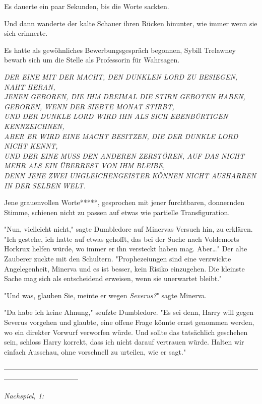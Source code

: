 {Es dauerte ein paar Sekunden, bis die Worte sackten.

Und dann wanderte der kalte Schauer ihren Rücken hinunter, wie immer wenn sie sich erinnerte.

Es hatte als gewöhnliches Bewerbungsgespräch begonnen, Sybill Trelawney bewarb sich um die Stelle als Professorin für Wahrsagen.

\emph{DER EINE MIT DER MACHT, DEN DUNKLEN LORD ZU BESIEGEN, NAHT HERAN,\\ JENEN GEBOREN, DIE IHM DREIMAL DIE STIRN GEBOTEN HABEN,\\ GEBOREN, WENN DER SIEBTE MONAT STIRBT,\\ UND DER DUNKLE LORD WIRD IHN ALS SICH EBENBÜRTIGEN KENNZEICHNEN,\\ ABER ER WIRD EINE MACHT BESITZEN, DIE DER DUNKLE LORD NICHT KENNT,\\ UND DER EINE MUSS DEN ANDEREN ZERSTÖREN, AUF DAS NICHT MEHR ALS EIN ÜBERREST VON IHM BLEIBE,\\ DENN JENE} \emph{ZWEI UNGLEICHENGEISTER} \emph{KÖNNEN NICHT AUSHARREN IN DER} \emph{SELBEN} \emph{WELT.}

Jene grauenvollen Worte*****, gesprochen mit jener furchtbaren, donnernden Stimme, schienen nicht zu passen auf etwas wie partielle Transfiguration.

"Nun, vielleicht nicht," sagte Dumbledore auf Minervas Versuch hin, zu erklären. "Ich gestehe, ich hatte auf etwas gehofft, das bei der Suche nach Voldemorts Horkrux helfen würde, wo immer er ihn versteckt haben mag. Aber…" Der alte Zauberer zuckte mit den Schultern. "Prophezeiungen sind eine verzwickte Angelegenheit, Minerva und es ist besser, kein Risiko einzugehen. Die kleinste Sache mag sich als entscheidend erweisen, wenn sie unerwartet bleibt."

"Und was, glauben Sie, meinte er wegen \emph{Severus?}" sagte Minerva.

"Da habe ich keine Ahnung," seufzte Dumbledore. "Es sei denn, Harry will gegen Severus vorgehen und glaubte, eine offene Frage könnte ernst genommen werden, wo ein direkter Vorwurf verworfen würde. Und sollte das tatsächlich geschehen sein, schloss Harry korrekt, dass ich nicht darauf vertrauen würde. Halten wir einfach Ausschau, ohne vorschnell zu urteilen, wie er sagt."

--------------------------------------------------------------------------------------------------------------------------------------------

\emph{Nachspiel, 1:}

}
